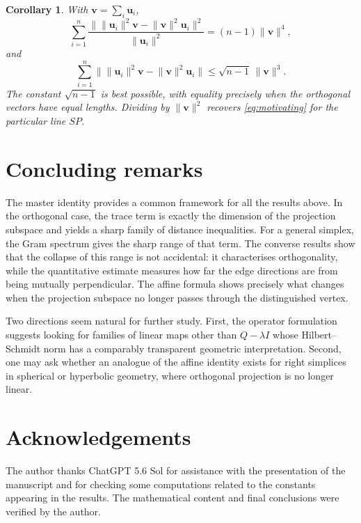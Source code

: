 \documentclass[11pt]{article}
\newtheorem{corollary}[theorem]{Corollary}
\theoremstyle{definition}
\theoremstyle{remark}
\newcommand{\bu}{\mathbf u}
\newcommand{\bv}{\mathbf v}
\newcommand{\norm}[1]{\lVert #1 \rVert}
\begin{document}
\begin{corollary}\label{cor:vector}
With $\bv=\sum_i\bu_i$,
\[
\sum_{i=1}^{n}
\frac{\bigl\lVert\norm{\bu_i}^{2}\bv-\norm\bv^{2}\bu_i\bigr\rVert^{2}}
{\norm{\bu_i}^{2}}
=
(n-1)\norm\bv^4,
\]
and
\[
\sum_{i=1}^{n}
\bigl\lVert\norm{\bu_i}^{2}\bv-\norm\bv^{2}\bu_i\bigr\rVert
\le
\sqrt{n-1}\,\norm\bv^3.
\]
The constant $\sqrt{n-1}$ is best possible, with equality precisely when the orthogonal
vectors have equal lengths. Dividing by $\norm\bv^2$ recovers \eqref{eq:motivating} for the
particular line $SP$.
\end{corollary}

\section{Concluding remarks}\label{sec:conclusion}

The master identity provides a common framework for all the results above. In the orthogonal case, the trace term is
exactly the dimension of the projection subspace and yields a sharp family of distance
inequalities. For a general simplex, the Gram spectrum gives the sharp range of that term.
The converse results show that the collapse of this range is not accidental: it
characterises orthogonality, while the quantitative estimate measures how far the edge
directions are from being mutually perpendicular. The affine formula shows precisely
what changes when the projection subspace no longer passes through the distinguished
vertex.

Two directions seem natural for further study. First, the operator formulation suggests
looking for families of linear maps other than $Q-\lambda I$ whose Hilbert--Schmidt norm has
a comparably transparent geometric interpretation. Second, one may ask whether an analogue
of the affine identity exists for right simplices in spherical or hyperbolic geometry,
where orthogonal projection is no longer linear.

\section*{Acknowledgements}

The author thanks ChatGPT 5.6 Sol for assistance with the presentation of the manuscript and for checking some computations related to the constants appearing in the results. The mathematical content and final conclusions were verified by the author.
\end{document}
